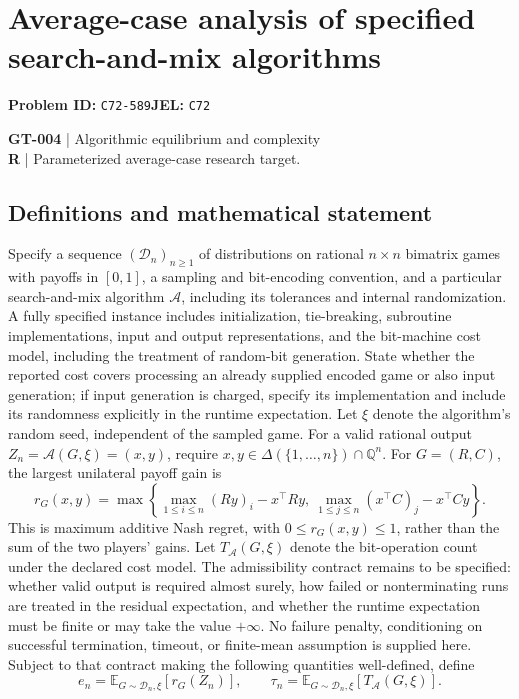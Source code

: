 \documentclass[11pt,a4paper]{article}
\begin{document}
\section*{Average-case analysis of specified search-and-mix algorithms}
\textbf{Problem ID:} \texttt{C72-589}\quad \textbf{JEL:} \texttt{C72}\par
\label{problem:OP-0134}
\label{game:GT-004}
{\sffamily\small\color{muted}
\textbf{GT-004} | Algorithmic equilibrium and complexity\\
\textbf{R} | Parameterized average-case research target.
\par}
\subsection*{Definitions and mathematical statement}
Specify a sequence $(\mathcal D_n)_{n\geq1}$ of distributions on rational $n\times n$ bimatrix games with payoffs in $[0,1]$, a sampling and bit-encoding convention, and a particular search-and-mix algorithm $\mathcal A$, including its tolerances and internal randomization. A fully specified instance includes initialization, tie-breaking, subroutine implementations, input and output representations, and the bit-machine cost model, including the treatment of random-bit generation. State whether the reported cost covers processing an already supplied encoded game or also input generation; if input generation is charged, specify its implementation and include its randomness explicitly in the runtime expectation. Let $\xi$ denote the algorithm's random seed, independent of the sampled game. For a valid rational output $Z_n=\mathcal A(G,\xi)=(x,y)$, require $x,y\in\Delta(\{1,\ldots,n\})\cap\mathbb Q^n$. For $G=(R,C)$, the largest unilateral payoff gain is
\[
 r_G(x,y)=\max\left\{\max_{1\leq i\leq n}(Ry)_i-x^\top Ry,\ \max_{1\leq j\leq n}(x^\top C)_j-x^\top Cy\right\}.
\]
This is maximum additive Nash regret, with $0\leq r_G(x,y)\leq1$, rather than the sum of the two players' gains. Let $T_{\mathcal A}(G,\xi)$ denote the bit-operation count under the declared cost model. The admissibility contract remains to be specified: whether valid output is required almost surely, how failed or nonterminating runs are treated in the residual expectation, and whether the runtime expectation must be finite or may take the value $+\infty$. No failure penalty, conditioning on successful termination, timeout, or finite-mean assumption is supplied here. Subject to that contract making the following quantities well-defined, define
\[
 e_n=\mathbb E_{G\sim\mathcal D_n,\xi}[r_G(Z_n)],\qquad
 \tau_n=\mathbb E_{G\sim\mathcal D_n,\xi}[T_{\mathcal A}(G,\xi)].
\]
\end{document}
